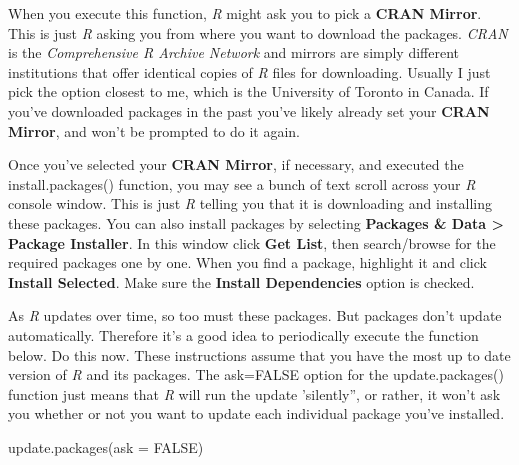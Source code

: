 \documentclass[
  10pt,
  letterpaper]{article}
\newenvironment{Shaded}{\begin{snugshade}}{\end{snugshade}}
\newcommand{\AttributeTok}[1]{\textcolor[rgb]{0.40,0.45,0.13}{#1}}
\newcommand{\ConstantTok}[1]{\textcolor[rgb]{0.56,0.35,0.01}{#1}}
\newcommand{\FunctionTok}[1]{\textcolor[rgb]{0.28,0.35,0.67}{#1}}
\newcommand{\NormalTok}[1]{\textcolor[rgb]{0.00,0.23,0.31}{#1}}
\renewcommand\texttt[1]{{\ttfamily\color{BrickRed}#1}}
\begin{document}
When you execute this function, \emph{R} might ask you to pick a
\textbf{CRAN Mirror}. This is just \emph{R} asking you from where you
want to download the packages. \emph{CRAN} is the \emph{Comprehensive R
Archive Network} and mirrors are simply different institutions that
offer identical copies of \emph{R} files for downloading. Usually I just
pick the option closest to me, which is the University of Toronto in
Canada. If you've downloaded packages in the past you've likely already
set your \textbf{CRAN Mirror}, and won't be prompted to do it again.

Once you've selected your \textbf{CRAN Mirror}, if necessary, and
executed the \texttt{install.packages()} function, you may see a bunch
of text scroll across your \emph{R} console window. This is just
\emph{R} telling you that it is downloading and installing these
packages. You can also install packages by selecting \textbf{Packages \&
Data \textgreater{} Package Installer}. In this window click \textbf{Get
List}, then search/browse for the required packages one by one. When you
find a package, highlight it and click \textbf{Install Selected}. Make
sure the \textbf{Install Dependencies} option is checked.

As \emph{R} updates over time, so too must these packages. But packages
don't update automatically. Therefore it's a good idea to periodically
execute the function below. Do this now. These instructions assume that
you have the most up to date version of \emph{R} and its packages. The
\texttt{ask=FALSE} option for the \texttt{update.packages()} function
just means that \emph{R} will run the update 'silently'', or rather, it
won't ask you whether or not you want to update each individual package
you've installed.

\begin{Shaded}
\begin{Highlighting}[]
\FunctionTok{update.packages}\NormalTok{(}\AttributeTok{ask =} \ConstantTok{FALSE}\NormalTok{)}
\end{Highlighting}
\end{Shaded}
\end{document}
